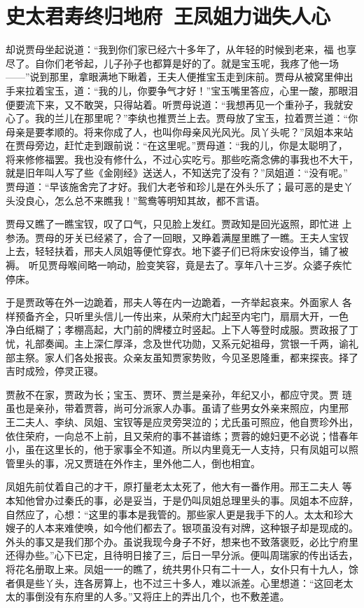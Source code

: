 \chapter{史太君寿终归地府~王凤姐力诎失人心}

却说贾母坐起说道：“我到你们家已经六十多年了，从年轻的时候到老来，福
也享尽了。自你们老爷起，儿子孙子也都算是好的了。就是宝玉呢，我疼了他一场
——”说到那里，拿眼满地下瞅着，王夫人便推宝玉走到床前。贾母从被窝里伸出
手来拉着宝玉，道：“我的儿，你要争气才好！”宝玉嘴里答应，心里一酸，那眼泪
便要流下来，又不敢哭，只得站着。听贾母说道：“我想再见一个重孙子，我就安
心了。我的兰儿在那里呢？”李纨也推贾兰上去。贾母放了宝玉，拉着贾兰道：“你
母亲是要孝顺的。将来你成了人，也叫你母亲风光风光。凤丫头呢？”凤姐本来站
在贾母旁边，赶忙走到跟前说：“在这里呢。”贾母道：“我的儿，你是太聪明了，
将来修修福罢。我也没有修什么，不过心实吃亏。那些吃斋念佛的事我也不大干，
就是旧年叫人写了些《金刚经》送送人，不知送完了没有？”凤姐道：“没有呢。”
贾母道：“早该施舍完了才好。我们大老爷和珍儿是在外头乐了；最可恶的是史丫
头没良心，怎么总不来瞧我！”鸳鸯等明知其故，都不言语。

贾母又瞧了一瞧宝钗，叹了口气，只见脸上发红。贾政知是回光返照，即忙进
上参汤。贾母的牙关已经紧了，合了一回眼，又睁着满屋里瞧了一瞧。王夫人宝钗
上去，轻轻扶着，邢夫人凤姐等便忙穿衣。地下婆子们已将床安设停当，铺了被褥。
听见贾母喉间略一响动，脸变笑容，竟是去了。享年八十三岁。众婆子疾忙停床。

于是贾政等在外一边跪着，邢夫人等在内一边跪着，一齐举起哀来。外面家人
各样预备齐全，只听里头信儿一传出来，从荣府大门起至内宅门，扇扇大开，一色
净白纸糊了；孝棚高起，大门前的牌楼立时竖起。上下人等登时成服。贾政报了丁
忧，礼部奏闻。主上深仁厚泽，念及世代功勋，又系元妃祖母，赏银一千两，谕礼
部主祭。家人们各处报丧。众亲友虽知贾家势败，今见圣恩隆重，都来探丧。择了
吉时成殓，停灵正寝。

贾赦不在家，贾政为长；宝玉、贾环、贾兰是亲孙，年纪又小，都应守灵。贾
琏虽也是亲孙，带着贾蓉，尚可分派家人办事。虽请了些男女外亲来照应，内里邢
王二夫人、李纨、凤姐、宝钗等是应灵旁哭泣的；尤氏虽可照应，他自贾珍外出，
依住荣府，一向总不上前，且又荣府的事不甚谙练；贾蓉的媳妇更不必说；惜春年
小，虽在这里长的，他于家事全不知道。所以内里竟无一人支持，只有凤姐可以照
管里头的事，况又贾琏在外作主，里外他二人，倒也相宜。

凤姐先前仗着自己的才干，原打量老太太死了，他大有一番作用。邢王二夫人
等本知他曾办过秦氏的事，必是妥当，于是仍叫凤姐总理里头的事。凤姐本不应辞，
自然应了，心想：“这里的事本是我管的。那些家人更是我手下的人。太太和珍大
嫂子的人本来难使唤，如今他们都去了。银项虽没有对牌，这种银子却是现成的。
外头的事又是我们那个办。虽说我现今身子不好，想来也不致落褒贬，必比宁府里
还得办些。”心下已定，且待明日接了三，后日一早分派。便叫周瑞家的传出话去，
将花名册取上来。凤姐一一的瞧了，统共男仆只有二十一人，女仆只有十九人，馀
者俱是些丫头，连各房算上，也不过三十多人，难以派差。心里想道：“这回老太
太的事倒没有东府里的人多。”又将庄上的弄出几个，也不敷差遣。

